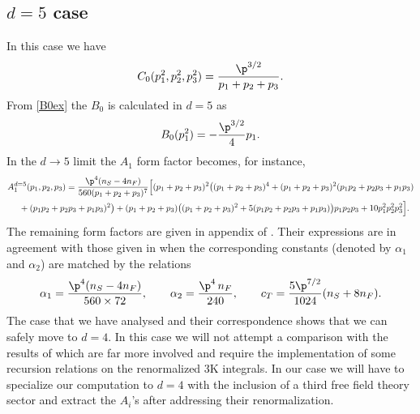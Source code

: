 \documentclass[a4paper,11pt,openright,twoside]{book}
\let\a=\alpha   \let\b=\beta   \let\g=\gamma   \let\d=\delta
\numberwithin{equation}{section}
\begin{document}
{{\subsection{$d=5$ case}
In this case we have
\begin{equation}
	{C}_0(p_1^2,p_2^2,p_3^2)=\frac{\p^{3/2}}{p_1+p_2+p_3}.
\end{equation}
From \eqref{B0ex} the ${B}_0$ is calculated in $d=5$ as
\begin{equation}
	{B}_0(p_1^2)=-\frac{\p^{3/2}}{4} p_1.
\end{equation}
In the $d\to 5$ limit the $A_1$ form factor becomes, for instance, 
\begin{align}
	A_{1}^{d=5}(p_1,p_2,p_3)&=\frac{\p^4(n_S-4n_F)}{560(p_1+p_2+p_3)^7}\Big[(p_1+p_2+p_3)^2\big((p_1+p_2+p_3)^4+(p_1+p_2+p_3)^2(p_1p_2+p_2p_3+p_1p_3)\notag\\
	&\hspace{-1.9cm}+(p_1p_2+p_2p_3+p_1p_3)^2\big)+(p_1+p_2+p_3)\big((p_1+p_2+p_3)^2+5(p_1p_2+p_2p_3+p_1p_3)\big)p_1p_2p_3+10p_1^2p_2^2p_3^2\Big].
\end{align}
The remaining form factors are given in appendix of \cite{Coriano:2018bsy}. 
Their expressions are in agreement with those given in \cite{Bzowski:2013sza} when the 
corresponding constants (denoted by $\a_1$ and $\a_2$) are matched by the relations
\begin{align}
	\a_1=\frac{\p^4(n_S-4n_F)}{560 \times 72}, \qquad \a_2=\frac{\p^4\,n_F}{240}, \qquad c_T=\frac{5\p^{7/2}}{1024}(n_S+8n_F).
\end{align}
The case that we have analysed and their correspondence shows that we can safely move to $d=4$. In this case we will not 
attempt a comparison with the results of \cite{Bzowski:2013sza} which are far more involved and 
require the implementation of some recursion relations on the renormalized 3K integrals. In our case we will have to specialize our computation to $d=4$ with the inclusion of a third free field theory sector and extract the $A_i$'s after addressing their renormalization.

}}
\end{document}
